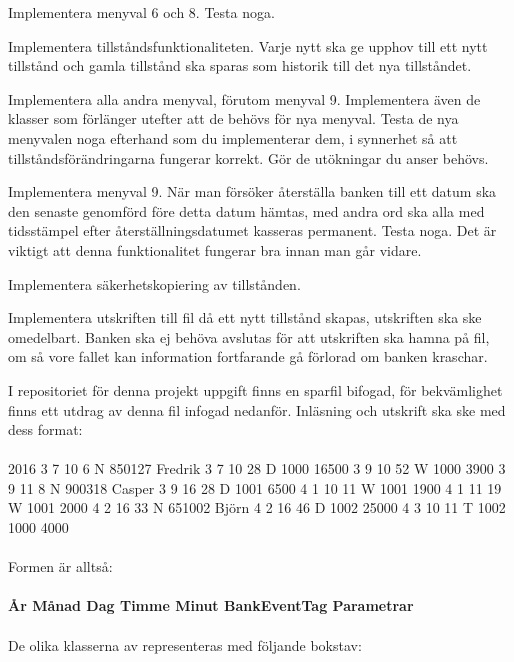 \Subtask Implementera menyval 6 och 8. Testa noga.

\Subtask Implementera tillståndsfunktionaliteten. Varje nytt  ska ge upphov till ett nytt tillstånd och gamla tillstånd ska sparas som historik till det nya tillståndet.

\Subtask Implementera alla andra menyval, förutom menyval 9. Implementera även de klasser som förlänger  utefter att de behövs för nya menyval.
Testa de nya menyvalen noga efterhand som du implementerar dem, i synnerhet så att tillståndsförändringarna fungerar korrekt. Gör de utökningar du anser behövs. 

\Task Implementera menyval 9. När man försöker återställa banken till ett datum ska den senaste  genomförd före detta datum hämtas, med andra ord ska alla  med tidsstämpel efter återställningsdatumet kasseras permanent. Testa noga. Det är viktigt att denna funktionalitet fungerar bra innan man går vidare.

\Task Implementera säkerhetskopiering av tillstånden.

\Subtask Implementera utskriften till fil då ett nytt tillstånd skapas, utskriften ska ske omedelbart. Banken ska ej behöva avslutas för att utskriften ska hamna på fil, om så vore fallet kan information fortfarande gå förlorad om banken kraschar.

I repositoriet för denna projekt uppgift finns en sparfil bifogad, för bekvämlighet finns ett utdrag av denna fil  infogad nedanför. Inläsning och utskrift ska ske med dess format:\\~\\
2016 3 7 10 6 N 850127 Fredrik 3 7 10 28 D 1000 16500 3 9 10 52 W 1000 3900 3 9 11 8 N 900318 Casper 3 9 16 28 D 1001 6500 4 1 10 11 W 1001 1900 4 1 11 19 W 1001 2000 4 2 16 33 N 651002 Björn 4 2 16 46 D 1002 25000 4 3 10 11 T 1002 1000 4000\\~\\
Formen är alltså:\\~\\
\textbf{År  Månad  Dag  Timme  Minut  BankEventTag  Parametrar}
\\~\\
De olika klasserna av  representeras med följande bokstav:

